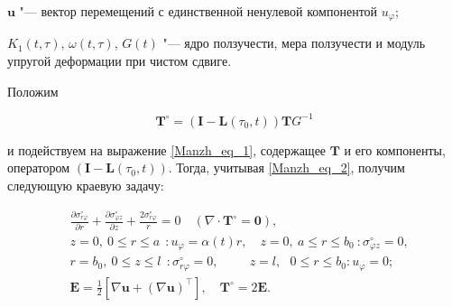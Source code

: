 $\mathbf u$ "--- вектор перемещений с единственной ненулевой компонентой $u_\varphi$; 

$K_1(t,\tau)$, $\omega(t,\tau)$, $G(t)$ "--- ядро ползучести, мера ползучести и модуль упругой деформации при чистом сдвиге.



Положим 

\begin{equation}%

\label{Manzh_eq_2}

  \mathbf T^\circ=(\mathbf I-\mathbf L(\tau_0,t))\mathbf T G^{-1}

\end{equation}

и подействуем на выражение \eqref{Manzh_eq_1}, содержащее $\mathbf T$ и его компоненты, оператором $(\mathbf I-\mathbf L(\tau_0,t))$. Тогда, учитывая \eqref{Manzh_eq_2}, получим следующую краевую задачу:

\begin{align}

  &\label{Manzh_eq_3}%

  \frac{\partial\sigma_{r\varphi}^\circ}{\partial r}+\frac{\partial\sigma_{\varphi z}^\circ}{\partial z}+\frac{2\sigma_{r\varphi}^\circ}r=0\quad

  (\nabla\cdot\mathbf T^\circ=\mathbf 0),

\\[2mm]

  &\nonumber

  z=0,\ 0\leq r\leq a  \ \ \colon u_\varphi=\alpha(t)r,

\quad 

  z=0,\ a\leq r\leq b_0 \ \colon\sigma_{\varphi z}^\circ=0,

\\

  &\nonumber

  r=b_0,\ 0\leq z\leq l \ \ \! \colon\sigma_{r\varphi}^\circ=0,

\quad  \quad  \ \ \!

  z=l,\ \ \ \! 0\leq r\leq b_0\colon u_\varphi=0;

\\[2mm]

  &\nonumber

  \mathbf E=\frac12[\nabla\mathbf u+(\nabla\mathbf u)^\top],\quad

  \mathbf T^\circ=2\mathbf E.

\end{align}



